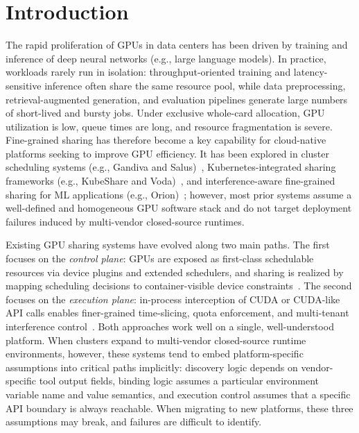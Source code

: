 \documentclass[runningheads,a4paper]{llncs}
\begin{document}
\section{Introduction}
The rapid proliferation of GPUs in data centers has been driven by training and inference of deep neural networks (e.g., large language models). In practice, workloads rarely run in
isolation: throughput-oriented training and latency-sensitive inference
often share the same resource pool, while data preprocessing,
retrieval-augmented generation, and evaluation pipelines generate large
numbers of short-lived and bursty jobs. Under exclusive whole-card
allocation, GPU utilization is low, queue times are long, and resource
fragmentation is severe. Fine-grained sharing has therefore become a key
capability for cloud-native platforms seeking to improve GPU
efficiency. It has been explored in cluster scheduling systems (e.g.,
Gandiva and Salus)~\cite{gandiva,salus}, Kubernetes-integrated sharing
frameworks (e.g., KubeShare and Voda)~\cite{voda,kubeshare}, and
interference-aware fine-grained sharing for ML applications (e.g.,
Orion)~\cite{orion}; however, most prior systems assume a well-defined and
homogeneous GPU software stack and do not target deployment failures
induced by multi-vendor closed-source runtimes.

Existing GPU sharing systems have evolved along two main paths. The first
focuses on the \emph{control plane}: GPUs are exposed as first-class
schedulable resources via device plugins and extended schedulers, and
sharing is realized by mapping scheduling decisions to container-visible
device constraints~\cite{k8s-device-plugin,kubeshare}.
The second focuses on the \emph{execution plane}: in-process interception
of CUDA or CUDA-like API calls enables finer-grained time-slicing,
quota enforcement, and multi-tenant interference
control~\cite{gemini,cuda-interception}. Both approaches work well on a
single, well-understood platform. When clusters expand to multi-vendor
closed-source runtime environments, however, these systems tend to embed platform-specific assumptions into critical paths implicitly: discovery logic depends
on vendor-specific tool output fields, binding logic assumes a particular
environment variable name and value semantics, and execution control
assumes that a specific API boundary is always reachable. When migrating
to new platforms, these three assumptions may break, and
failures are difficult to identify.
\end{document}
